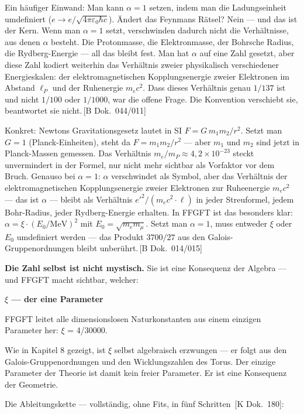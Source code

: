 \documentclass[11pt,oneside]{book}
\newcommand{\status}[1]{\penalty10000\,{\scriptsize\textcolor{gray!60}{[#1]}}}
\begin{document}
Ein häufiger Einwand: Man kann $\alpha = 1$ setzen, indem man die Ladungseinheit
umdefiniert ($e \to e/\sqrt{4\pi\varepsilon_0\hbar c}$). Ändert das Feynmans Rätsel?
Nein — und das ist der Kern. Wenn man $\alpha = 1$ setzt, verschwinden dadurch
nicht die Verhältnisse, aus denen $\alpha$ besteht. Die Protonmasse, die
Elektronmasse, der Bohrsche Radius, die Rydberg-Energie — all das bleibt
fest. Man hat $\alpha$ auf eine Zahl gesetzt, aber diese Zahl kodiert weiterhin
das Verhältnis zweier physikalisch verschiedener Energieskalen: der
elektromagnetischen Kopplungsenergie zweier Elektronen im Abstand $\ell_P$
und der Ruhenergie $m_e c^2$. Dass dieses Verhältnis genau $1/137$ ist und
nicht $1/100$ oder $1/1000$, war die offene Frage. Die Konvention
verschiebt sie, beantwortet sie nicht.\status{B Dok.~044/011}

Konkret: Newtons Gravitationsgesetz lautet in SI
$F = G\,m_1 m_2/r^2$. Setzt man $G=1$ (Planck-Einheiten), steht da
$F = m_1 m_2/r^2$ — aber $m_1$ und $m_2$ sind jetzt in Planck-Massen
gemessen. Das Verhältnis $m_e/m_P \approx 4{,}2\times10^{-23}$ steckt
unvermindert in der Formel, nur nicht mehr sichtbar als Vorfaktor
vor dem Bruch. Genauso bei $\alpha=1$: $\alpha$ verschwindet als Symbol,
aber das Verhältnis der elektromagnetischen Kopplungsenergie zweier
Elektronen zur Ruheenergie $m_e c^2$ — das ist $\alpha$ — bleibt
als Verhältnis $e'^2/(m_e c^2 \cdot \ell)$ in jeder Streuformel,
jedem Bohr-Radius, jeder Rydberg-Energie erhalten.
In FFGFT ist das besonders klar: $\alpha = \xi\cdot(E_0/\mathrm{MeV})^2$
mit $E_0 = \sqrt{m_e m_\mu}$. Setzt man $\alpha=1$, muss entweder $\xi$
oder $E_0$ umdefiniert werden — das Produkt $3700/27$ aus den
Galois-Gruppenordnungen bleibt unberührt.\status{B Dok.~014/015}

\textbf{Die Zahl selbst ist nicht mystisch.} Sie ist eine Konsequenz
der Algebra — und FFGFT macht sichtbar, welcher:


\textbf{$\xi$ — der eine Parameter}


FFGFT leitet alle dimensionslosen Naturkonstanten aus einem einzigen
Parameter her: $\xi$ = 4/30000.


Wie in Kapitel 8 gezeigt, ist $\xi$ selbst algebraisch erzwungen — er folgt
aus den Galois-Gruppenordnungen und den Wicklungszahlen des Torus. Der
einzige Parameter der Theorie ist damit kein freier Parameter. Er ist
eine Konsequenz der Geometrie.


Die Ableitungskette — vollständig, ohne Fits, in fünf Schritten
\status{K Dok.~180}:
\end{document}
